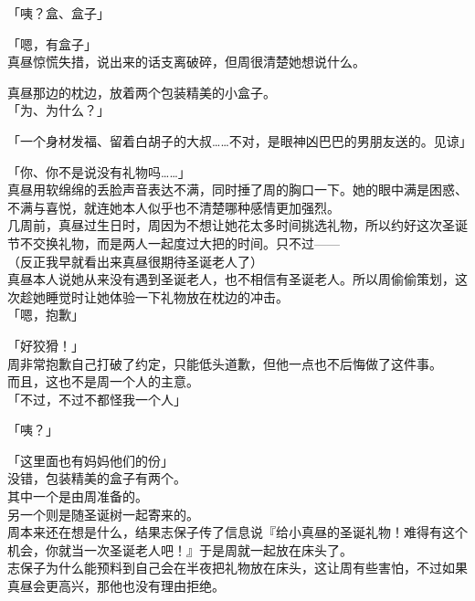 「咦？盒、盒子」

「嗯，有盒子」\\

真昼惊慌失措，说出来的话支离破碎，但周很清楚她想说什么。

真昼那边的枕边，放着两个包装精美的小盒子。\\

「为、为什么？」

「一个身材发福、留着白胡子的大叔……不对，是眼神凶巴巴的男朋友送的。见谅」

「你、你不是说没有礼物吗……」\\

真昼用软绵绵的丢脸声音表达不满，同时捶了周的胸口一下。她的眼中满是困惑、不满与喜悦，就连她本人似乎也不清楚哪种感情更加强烈。\\

几周前，真昼过生日时，周因为不想让她花太多时间挑选礼物，所以约好这次圣诞节不交换礼物，而是两人一起度过大把的时间。只不过——\\

（反正我早就看出来真昼很期待圣诞老人了）\\

真昼本人说她从来没有遇到圣诞老人，也不相信有圣诞老人。所以周偷偷策划，这次趁她睡觉时让她体验一下礼物放在枕边的冲击。\\

「嗯，抱歉」

「好狡猾！」\\

周非常抱歉自己打破了约定，只能低头道歉，但他一点也不后悔做了这件事。\\

而且，这也不是周一个人的主意。\\

「不过，不过不都怪我一个人」

「咦？」

「这里面也有妈妈他们的份」\\

没错，包装精美的盒子有两个。\\

其中一个是由周准备的。\\

另一个则是随圣诞树一起寄来的。\\

周本来还在想是什么，结果志保子传了信息说『给小真昼的圣诞礼物！难得有这个机会，你就当一次圣诞老人吧！』于是周就一起放在床头了。\\

志保子为什么能预料到自己会在半夜把礼物放在床头，这让周有些害怕，不过如果真昼会更高兴，那他也没有理由拒绝。\\

